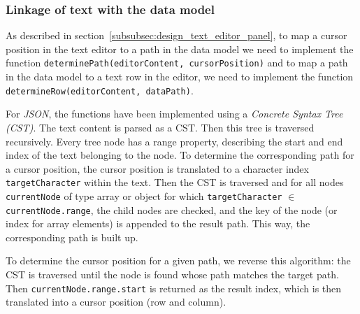 
\subsubsection{Linkage of text with the data model}
As described in section~\ref{subsubsec:design_text_editor_panel}, to map a cursor position in the text editor to
a path in the data model we need to implement the function \texttt{determinePath(editorContent, cursorPosition)}
and to map a path in the data model to a text row in the editor, we need to implement
the function \texttt{determineRow(editorContent, dataPath)}.

For \textit{JSON}, the functions have been implemented using a \textit{Concrete Syntax Tree (CST)}.
The text content is parsed as a CST.
Then this tree is traversed recursively.
Every tree node has a range property, describing the start and end index of the text belonging to the node.
To determine the corresponding path for a cursor position, the cursor position is translated to a character index
\texttt{targetCharacter} within the text.
Then the CST is traversed and for all nodes \texttt{currentNode} of type array or object for
which \texttt{targetCharacter} $\in$ \texttt{currentNode.range},
the child nodes are checked, and the key of the node (or index for array elements) is appended to the result path.
This way, the corresponding path is built up.

To determine the cursor position for a given path, we reverse this algorithm:
the CST is traversed until the node is found whose path matches the target path.
Then \texttt{currentNode.range.start} is returned as the result index, which is then translated into a cursor position (row and column).

